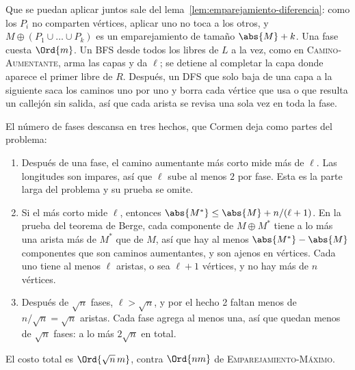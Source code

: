\documentclass[11pt,letterpaper]{article}
\begin{document}
Que se puedan aplicar juntos sale del
lema~\ref{lem:emparejamiento-diferencia}: como los $P_i$ no comparten
vértices, aplicar uno no toca a los otros, y
$M \oplus (P_1 \cup \dots \cup P_k)$ es un emparejamiento de tamaño
$\abs{M} + k$. Una fase cuesta $\Ord{m}$. Un BFS desde todos los
libres de $L$ a la vez, como en \textsc{Camino-Aumentante}, arma las
capas y da $\ell$; se detiene al completar la capa donde aparece el
primer libre de $R$. Después, un DFS que solo baja de una capa a la
siguiente saca los caminos uno por uno y borra cada vértice que usa o
que resulta un callejón sin salida, así que cada arista se revisa una
sola vez en toda la fase.

El número de fases descansa en tres hechos, que Cormen deja como
partes del problema:
\begin{enumerate}
  \item Después de una fase, el camino aumentante más corto mide más
    de $\ell$. Las longitudes son impares, así que $\ell$ sube al
    menos $2$ por fase. Esta es la parte larga del problema y su
    prueba se omite.
  \item Si el más corto mide $\ell$, entonces
    $\abs{M^*} \le \abs{M} + n/(\ell + 1)$. En la prueba del teorema
    de Berge, cada componente de $M \oplus M^*$ tiene a lo más una
    arista más de $M^*$ que de $M$, así que hay al menos
    $\abs{M^*} - \abs{M}$ componentes que son caminos aumentantes, y
    son ajenos en vértices. Cada uno tiene al menos $\ell$ aristas, o
    sea $\ell + 1$ vértices, y no hay más de $n$ vértices.
  \item Después de $\sqrt{n}$ fases, $\ell > \sqrt{n}$, y por el
    hecho 2 faltan menos de $n / \sqrt{n} = \sqrt{n}$ aristas. Cada
    fase agrega al menos una, así que quedan menos de $\sqrt{n}$
    fases: a lo más $2\sqrt{n}$ en total.
\end{enumerate}
El costo total es $\Ord{\sqrt{n}\, m}$, contra $\Ord{nm}$ de
\textsc{Emparejamiento-Máximo}.
\end{document}
